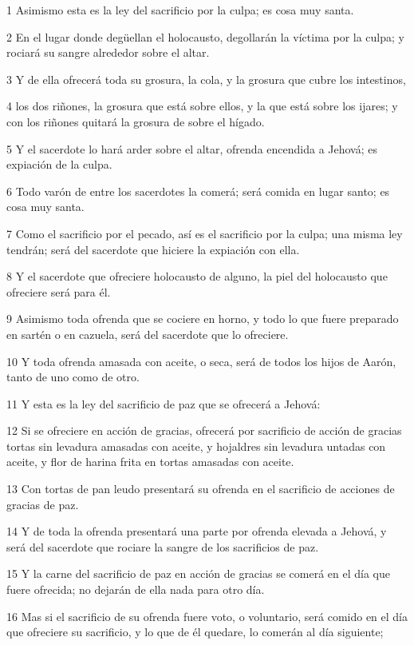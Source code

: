 \par 1 Asimismo esta es la ley del sacrificio por la culpa; es cosa muy santa.
\par 2 En el lugar donde degüellan el holocausto, degollarán la víctima por la culpa; y rociará su sangre alrededor sobre el altar.
\par 3 Y de ella ofrecerá toda su grosura, la cola, y la grosura que cubre los intestinos,
\par 4 los dos riñones, la grosura que está sobre ellos, y la que está sobre los ijares; y con los riñones quitará la grosura de sobre el hígado.
\par 5 Y el sacerdote lo hará arder sobre el altar, ofrenda encendida a Jehová; es expiación de la culpa.
\par 6 Todo varón de entre los sacerdotes la comerá; será comida en lugar santo; es cosa muy santa.
\par 7 Como el sacrificio por el pecado, así es el sacrificio por la culpa; una misma ley tendrán; será del sacerdote que hiciere la expiación con ella.
\par 8 Y el sacerdote que ofreciere holocausto de alguno, la piel del holocausto que ofreciere será para él.
\par 9 Asimismo toda ofrenda que se cociere en horno, y todo lo que fuere preparado en sartén o en cazuela, será del sacerdote que lo ofreciere.
\par 10 Y toda ofrenda amasada con aceite, o seca, será de todos los hijos de Aarón, tanto de uno como de otro.
\par 11 Y esta es la ley del sacrificio de paz que se ofrecerá a Jehová:
\par 12 Si se ofreciere en acción de gracias, ofrecerá por sacrificio de acción de gracias tortas sin levadura amasadas con aceite, y hojaldres sin levadura untadas con aceite, y flor de harina frita en tortas amasadas con aceite.
\par 13 Con tortas de pan leudo presentará su ofrenda en el sacrificio de acciones de gracias de paz.
\par 14 Y de toda la ofrenda presentará una parte por ofrenda elevada a Jehová, y será del sacerdote que rociare la sangre de los sacrificios de paz.
\par 15 Y la carne del sacrificio de paz en acción de gracias se comerá en el día que fuere ofrecida; no dejarán de ella nada para otro día.
\par 16 Mas si el sacrificio de su ofrenda fuere voto, o voluntario, será comido en el día que ofreciere su sacrificio, y lo que de él quedare, lo comerán al día siguiente;
